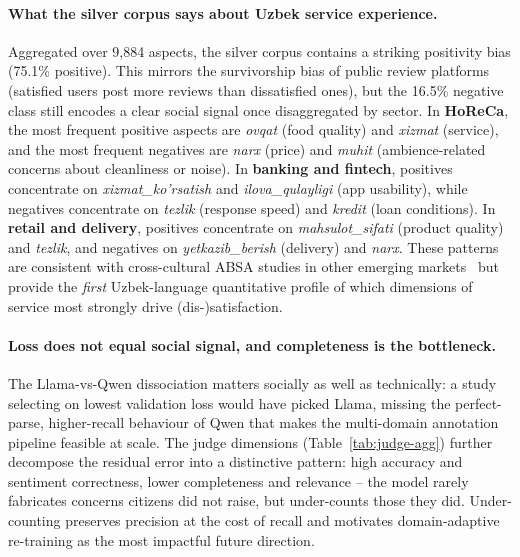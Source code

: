 \documentclass[runningheads]{llncs}
\begin{document}
\paragraph{What the silver corpus says about Uzbek service experience.}
Aggregated over 9{,}884 aspects, the silver corpus contains a striking
positivity bias (75.1\% positive). This mirrors the survivorship bias of
public review platforms (satisfied users post more reviews than
dissatisfied ones), but the 16.5\% negative class still encodes a clear
social signal once disaggregated by sector. In \textbf{HoReCa}, the most
frequent positive aspects are \textit{ovqat} (food quality) and
\textit{xizmat} (service), and the most frequent negatives are
\textit{narx} (price) and \textit{muhit} (ambience-related concerns
about cleanliness or noise). In \textbf{banking and fintech}, positives
concentrate on \textit{xizmat\_ko'rsatish} and \textit{ilova\_qulayligi}
(app usability), while negatives concentrate on \textit{tezlik}
(response speed) and \textit{kredit} (loan conditions). In \textbf{retail
and delivery}, positives concentrate on \textit{mahsulot\_sifati}
(product quality) and \textit{tezlik}, and negatives on
\textit{yetkazib\_berish} (delivery) and \textit{narx}. These patterns
are consistent with cross-cultural ABSA studies in other emerging
markets~\cite{electronics12030515} but provide the \emph{first}
Uzbek-language quantitative profile of which dimensions of service most
strongly drive (dis-)satisfaction.

\paragraph{Loss does not equal social signal, and completeness is the
bottleneck.} The Llama-vs-Qwen dissociation matters socially as well as
technically: a study selecting on lowest validation loss would have picked
Llama, missing the perfect-parse, higher-recall behaviour of Qwen that makes
the multi-domain annotation pipeline feasible at scale. The judge
dimensions (Table~\ref{tab:judge-agg}) further decompose the residual
error into a distinctive pattern: high accuracy and sentiment
correctness, lower completeness and relevance -- the model rarely
fabricates concerns citizens did not raise, but under-counts those they
did. Under-counting preserves precision at the cost of recall and
motivates domain-adaptive re-training as the most impactful future
direction.
\end{document}
